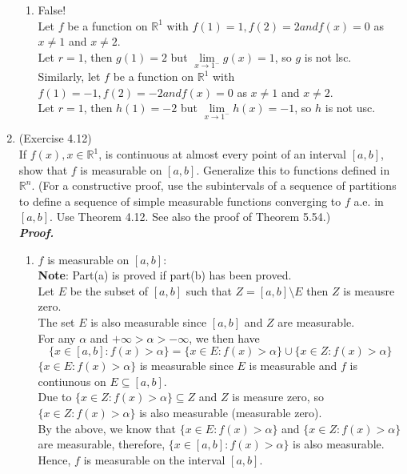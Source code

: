 \documentclass[a4paper,11pt]{article}
\begin{document}
\begin{enumerate}
\begin{enumerate}
\item
False!\\
Let $f$ be a function on $\mathbb{R}^1$ with $f(1) = 1, f(2) = 2 and f(x) = 0$ as $x \neq 1$ and $x \neq 2$.\\
Let $r = 1$, then $g(1) = 2$ but $\underset{x \to 1^-}{\lim} g(x) = 1$, so $g$ is not lsc.\\
Similarly, let $f$ be a function on $\mathbb{R}^1$ with $f(1) = -1, f(2) = -2 and f(x) = 0$ as $x \neq 1$ and $x \neq 2$.\\
Let $r = 1$, then $h(1) = -2$ but $\underset{x \to 1^-}{\lim} h(x) = -1$, so $h$ is not usc.\\
\end{enumerate}


\item (Exercise 4.12)\\
If $f(x), x \in \mathbb{R}^1$, is continuous at almost every point of an interval $[a,b]$, show that $f$ is measurable on $[a,b]$. Generalize this to functions defined in $\mathbb{R}^n$.  (For a constructive proof, use the subintervals of a sequence of partitions to define a sequence of simple measurable functions converging to $f$ a.e. in $[a,b]$. Use Theorem 4.12. See also the proof of Theorem 5.54.)\\
\newline
\textit{\textbf {Proof.}}

\begin{enumerate}

\item $f$ is measurable on $[a,b]$:\\

\textbf{Note}: Part(a) is proved if part(b) has been proved.\\

Let $E$ be the subset of $[a,b]$ such that $Z = [a,b] \setminus E$ then $Z$ is meausre zero.\\
The set $E$ is also measurable since $[a,b]$ and $Z$ are measurable.\\
For any $\alpha$ and $+\infty > \alpha > -\infty$, we then have
$$\{ x \in [a,b] : f(x) > \alpha\} = \{ x \in E : f(x) > \alpha\} \cup \{ x \in Z : f(x) > \alpha\}$$
$\{ x \in E : f(x) > \alpha\}$ is measurable since $E$ is measurable and $f$ is contiunous on $E \subseteq [a,b]$.\\
Due to $\{ x \in Z : f(x) > \alpha\} \subseteq Z$ and $Z$ is measure zero, so $\{ x \in Z : f(x) > \alpha\}$ is also measurable (measurable zero).\\
By the above, we know that $\{ x \in E : f(x) > \alpha\}$ and $\{ x \in Z : f(x) > \alpha\}$ are measurable, therefore, $\{ x \in [a,b] : f(x) > \alpha\}$ is also measurable.\\
Hence, $f$ is measurable on the interval $[a,b]$.\\


\end{enumerate}
\end{enumerate}
\end{document}
